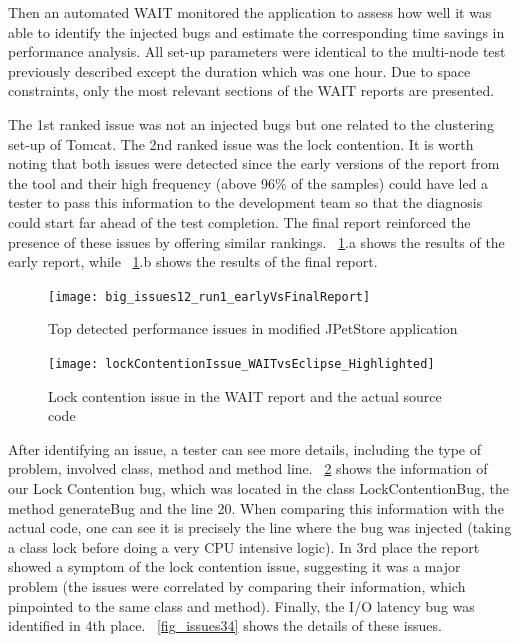 \documentclass[runningheads,a4paper]{llncs}
\begin{document}
Then an automated WAIT monitored the application to assess how well
it was able to identify the injected bugs and estimate the corresponding time
savings in performance analysis. All set-up parameters were identical to
the multi-node test previously described except the duration which
was one hour. Due to space constraints, only the most relevant sections
of the WAIT reports are presented.

The 1st ranked issue was not an injected bugs but one related to the
clustering set-up of Tomcat.
The 2nd ranked issue was the lock
contention. It is worth noting that both issues were
detected since the early versions of the report from the tool and their high
frequency (above 96\% of the samples) could have led a tester to pass this
information to the development team so that the diagnosis could start far ahead
of the test completion. The final report reinforced the presence of these issues 
by offering similar rankings. \figurename ~\ref{fig_run1_bugs12}.a shows the
results of the early report, while ~\ref{fig_run1_bugs12}.b shows the results of 
the final report.

\begin{figure}[!h]
\centering
\texttt{[image: big\_issues12\_run1\_earlyVsFinalReport]}
\caption{Top detected performance issues in modified JPetStore application}
\label{fig_run1_bugs12}
\end{figure}

\begin{figure}[!h]
\centering
\texttt{[image: lockContentionIssue\_WAITvsEclipse\_Highlighted]}
\caption{Lock contention issue in the WAIT report and the actual source code}
\label{fig_issue2_vs_code}
\end{figure}

After identifying an issue, a tester can see more details, including the type of
problem, involved class, method and method line. \figurename
~\ref{fig_issue2_vs_code} shows the information of our Lock Contention bug,
which was located in the class LockContentionBug, the method generateBug and the
line 20. When comparing this information with the actual code, one can see it
is precisely the line where the bug was injected (taking a class lock before
doing a very CPU intensive logic). In 3rd place the report showed a symptom of
the lock contention issue, suggesting it was a major problem (the issues were
correlated by comparing their information, which pinpointed to the same class and
method). Finally, the I/O latency bug was identified in 4th place. \figurename
~\ref{fig_issues34} shows the details of these issues.
\end{document}
